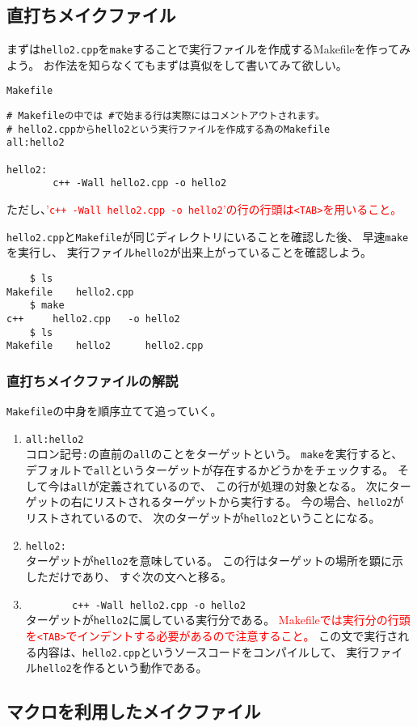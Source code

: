  
 \subsection{直打ちメイクファイル}
まずは\texttt{hello2.cpp}を\verb|make|することで実行ファイルを作成するMakefileを作ってみよう。
お作法を知らなくてもまずは真似をして書いてみて欲しい。
\begin{itembox}{\texttt{Makefile}}
\begin{verbatim}
# Makefileの中では #で始まる行は実際にはコメントアウトされます。
# hello2.cppからhello2という実行ファイルを作成する為のMakefile
all:hello2

hello2:
        c++ -Wall hello2.cpp -o hello2
\end{verbatim}
\end{itembox}
ただし、\textcolor{red}{'\texttt{c++ -Wall hello2.cpp -o hello2}'の行の行頭は\texttt{<TAB>}を用いること。}

\texttt{hello2.cpp}と\texttt{Makefile}が同じディレクトリにいることを確認した後、
早速\verb|make|を実行し、
実行ファイル\texttt{hello2}が出来上がっていることを確認しよう。
\begin{verbatim}
	$ ls
Makefile	hello2.cpp
	$ make
c++     hello2.cpp   -o hello2
	$ ls
Makefile	hello2		hello2.cpp
\end{verbatim}


\subsubsection*{直打ちメイクファイルの解説}
\texttt{Makefile}の中身を順序立てて追っていく。
\begin{enumerate}
 \item \verb|all:hello2| \\
       コロン記号\verb|:|の直前の\verb|all|のことをターゲットという。
       \verb|make|を実行すると、デフォルトで\verb|all|というターゲットが存在するかどうかをチェックする。
       そして今は\verb|all|が定義されているので、
       この行が処理の対象となる。
       次にターゲットの右にリストされるターゲットから実行する。
       今の場合、\verb|hello2|がリストされているので、
       次のターゲットが\verb|hello2|ということになる。

 \item \verb|hello2:| \\
       ターゲットが\verb|hello2|を意味している。
       この行はターゲットの場所を顕に示しただけであり、
       すぐ次の文へと移る。
       
\item \verb|        c++ -Wall hello2.cpp -o hello2| \\
       ターゲットが\verb|hello2|に属している実行分である。
      \textcolor{red}{Makefileでは実行分の行頭を\texttt{<TAB>}でインデントする必要があるので注意すること。}
      この文で実行される内容は、\verb|hello2.cpp|というソースコードをコンパイルして、
      実行ファイル\verb|hello2|を作るという動作である。
\end{enumerate}




 \subsection{マクロを利用したメイクファイル}
